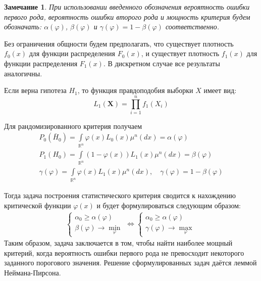 \documentclass[oneside,final,14pt]{extreport}
\newtheorem*{rmrk}{Замечание}
\theoremstyle{definition}
\begin{document}
\begin{rmrk}
При использовании введенного обозначения вероятность ошибки первого рода, вероятность ошибки второго рода и мощность критерия будем обозначать: $\alpha(\varphi)$, $\beta(\varphi)$ и $\gamma(\varphi)=1-\beta(\varphi)$ соответственно.
\end{rmrk}

Без ограничения общности будем предполагать, что существует плотность $f_{0}(x)$ для функции распределения $F_{0}(x)$, и существует плотность $f_{1}(x)$ для функции распределения $F_{1}(x)$. В дискретном случае все результаты аналогичны.

Если верна гипотеза $H_1$, то функция правдоподобия выборки $X$ имеет вид:
\begin{equation*}
    L_{1}\left(\mathbf{X}\right)=\prod_{i=1}^{n} f_{1}\left(X_{i}\right)
\end{equation*}

Для рандомизированного критерия получаем
\begin{gather*}
    P_{0}\left(\bar{H}_{0}\right)=\int\limits_{\mathbb{R}^{n}} \varphi(x) L_{0}(x) \mu^{n}(d x)=\alpha(\varphi) \\
    P_{1}\left(H_{0}\right)=\int\limits_{\mathbb{R}^{n}}(1-\varphi(x)) L_{1}(x) \mu^{n}(d x)=\beta(\varphi) \\
    \gamma(\varphi)=\int\limits_{\mathbb{R}^{n}} \varphi(x) L_{1}(x) \mu^{n}(d x), \quad \gamma(\varphi)=1-\beta(\varphi)
\end{gather*}

Тогда задача построения статистического критерия сводится к нахождению критической функции $\varphi(x)$ и будет формулироваться следующим образом:
\begin{equation*}
    \begin{array}{l}
    \left\{\begin{array}{l}
    \alpha_{0} \geqslant \alpha(\varphi) \\
    \beta(\varphi) \rightarrow \min\limits_{\varphi}
    \end{array}\right.
    \Leftrightarrow
    \left\{\begin{array}{l}
    \alpha_{0} \geqslant \alpha(\varphi) \\
    \gamma(\varphi) \rightarrow \max\limits_{\varphi}
    \end{array}\right.
    \end{array}
\end{equation*}
Таким образом, задача заключается в том, чтобы найти наиболее мощный критерий, когда вероятность ошибки первого рода не превосходит некоторого заданного порогового значения. Решение сформулированных задач даётся леммой Неймана-Пирсона.
\end{document}
